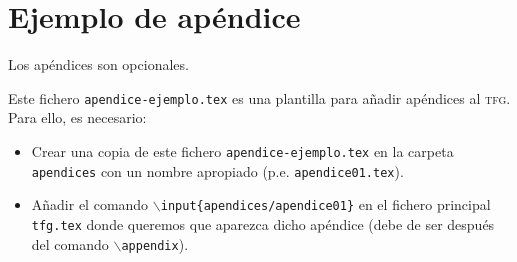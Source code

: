 
\chapter{Ejemplo de apéndice}\label{ap:apendice1}

Los apéndices son opcionales.

Este fichero \texttt{apendice-ejemplo.tex} es una plantilla para añadir apéndices al \textsc{tfg}. Para ello, es necesario:
\begin{itemize}
    \item Crear una copia de este fichero \texttt{apendice-ejemplo.tex} en la carpeta \texttt{apendices} con un nombre apropiado (p.e. \texttt{apendice01.tex}).
    \item Añadir el comando \texttt{$\backslash$input\{apendices/apendice01\}} en el fichero principal \texttt{tfg.tex} donde queremos que aparezca dicho apéndice (debe de ser después del comando \texttt{$\backslash$appendix}).
\end{itemize}

\endinput
